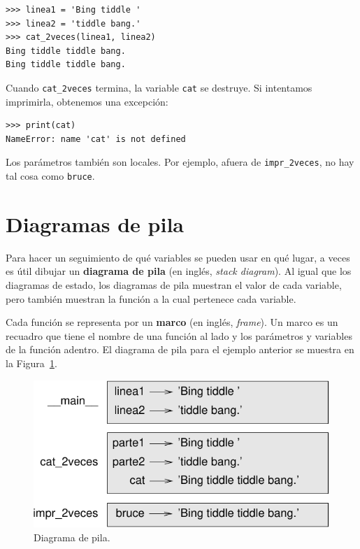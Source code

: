 \documentclass[10pt]{book}
\begin{document}
\begin{verbatim}
>>> linea1 = 'Bing tiddle '
>>> linea2 = 'tiddle bang.'
>>> cat_2veces(linea1, linea2)
Bing tiddle tiddle bang.
Bing tiddle tiddle bang.
\end{verbatim}
%
Cuando \verb"cat_2veces" termina, la variable {\tt cat}
se destruye.  Si intentamos imprimirla, obtenemos una excepción:

\begin{verbatim}
>>> print(cat)
NameError: name 'cat' is not defined
\end{verbatim}
%
Los parámetros también son locales.
Por ejemplo, afuera de \verb"impr_2veces", no hay
tal cosa como {\tt bruce}.


\section{Diagramas de pila}
\label{stackdiagram}

Para hacer un seguimiento de qué variables se pueden usar en qué lugar, a veces es
útil dibujar un {\bf diagrama de pila} (en inglés, {\em stack diagram}).  Al igual que los diagramas de estado,
los diagramas de pila muestran el valor de cada variable, pero también muestran la
función a la cual pertenece cada variable.

Cada función se representa por un {\bf marco} (en inglés, {\em frame}).  Un marco es un recuadro que tiene
el nombre de una función al lado y los parámetros y variables de
la función adentro.  El diagrama de pila para el ejemplo anterior se
muestra en la Figura~\ref{fig.stack}.

\begin{figure}
\centerline
{\includegraphics[scale=0.8]{figs/stack.pdf}}
\caption{Diagrama de pila.}
\label{fig.stack}
\end{figure}
\end{document}
